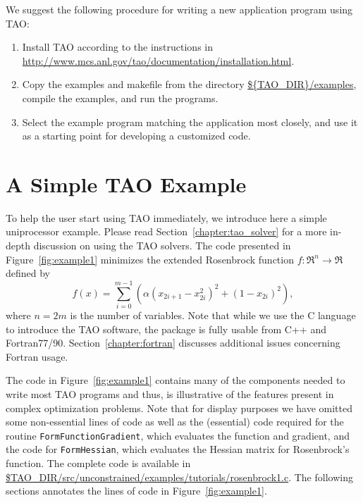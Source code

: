 We suggest the following procedure for writing a new application
program using TAO:

\begin{enumerate}
\item Install TAO according to the instructions in
  \url{http://www.mcs.anl.gov/tao/documentation/installation.html}.
\item Copy the examples and makefile from the directory
  \url{${TAO\_DIR}/examples}, %
  compile the examples, and run the programs. 
\item Select the example program matching the application most
  closely, and use it as a starting point for developing a customized
  code.
\end{enumerate}

\section{A Simple TAO Example}
\label{sec:simple}

To help the user start using TAO immediately, we introduce here a simple
uniprocessor example. Please read Section~\ref{chapter:tao_solver} for a 
more in-depth discussion on using the TAO solvers.
The code presented in Figure~\ref{fig:example1} minimizes the
extended Rosenbrock function $f: \Re^n \to \Re$ defined by
\[
 f(x) = 
 \sum_{i=0}^{m-1} \left( \alpha(x_{2i+1}-x_{2i}^2)^2 + (1-x_{2i})^2 \right),
\]
where $n = 2m$ is the number of variables.  Note that while we use the C 
language to introduce the TAO software, the package is fully usable from 
C++ and Fortran77/90.  Section~\ref{chapter:fortran} discusses additional 
issues concerning Fortran usage.



The code in Figure~\ref{fig:example1} contains many of the components
needed to write most TAO programs and thus, is illustrative of the
features present in complex optimization problems.  Note that for
display purposes we have omitted some non-essential lines of code as well as the
(essential) code required for the routine \texttt{FormFunctionGradient},
which evaluates the function and gradient, and the code for
\texttt{FormHessian}, which evaluates the Hessian matrix for Rosenbrock's
function. The complete code is available in \url{$TAO\_DIR/src/unconstrained/examples/tutorials/rosenbrock1.c}. %
The following sections annotates the lines of code in
Figure~\ref{fig:example1}.


